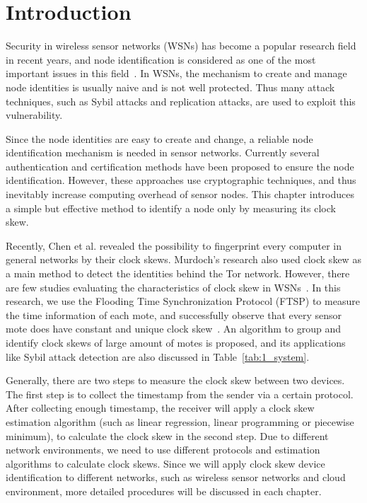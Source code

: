 \chapter{Introduction}
\label{cha:1_introduction} 

Security in wireless sensor networks (WSNs) has become a popular research field in recent years, and node identification is considered as one of the most important issues in this field~\cite{MaddenFHH02}. In WSNs, the mechanism to create and manage node identities is usually naive and is not well protected. Thus many attack techniques, such as Sybil attacks and replication attacks, are used to exploit this vulnerability. 

	Since the node identities are easy to create and change, a reliable node identification mechanism is needed in sensor networks. Currently several authentication and certification methods have been proposed to ensure the node identification. However, these approaches use cryptographic techniques, and thus inevitably increase computing overhead of sensor nodes. This chapter introduces a simple but effective method to identify a node only by measuring its clock skew.

	Recently, Chen et al. revealed the possibility to fingerprint every computer in general networks by their clock skews. Murdoch's research also used clock skew as a main method to detect the identities behind the Tor network. However, there are few studies evaluating the characteristics of clock skew in WSNs~\cite{GarofalakisHM07}. In this research, we use the Flooding Time Synchronization Protocol (FTSP) to measure the time information of each mote, and successfully observe that every sensor mote does have constant and unique clock skew~\cite{KotiVDSD07, SubrPPKG06, ShengLMJ07, Wagner04}. An algorithm to group and identify clock skews of large amount of motes is proposed, and its applications like Sybil attack detection are also discussed in Table~\ref{tab:1_system}.
	
	Generally, there are two steps to measure the clock skew between two devices.
	The first step is to collect the timestamp from the sender via a certain protocol.
	After collecting enough timestamp, the receiver will apply a clock skew estimation algorithm (such as linear regression, linear programming or piecewise minimum), to calculate the clock skew in the second step.
	Due to different network environments, we need to use different protocols and estimation algorithms to calculate clock skews.
	Since we will apply clock skew device identification to different networks, such as wireless sensor networks and cloud environment, more detailed procedures will be discussed in each chapter.


